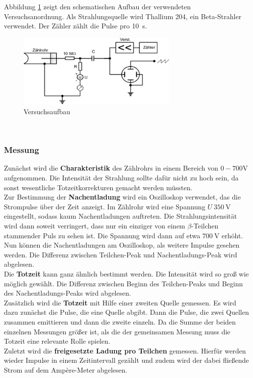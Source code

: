 Abbildung \ref{fig:Versuchsaufbau} zeigt den schematischen Aufbau der verwendeten Versuchsanordnung. Als Strahlungsquelle wird Thallium 204, ein Beta-Strahler verwendet. Der Zähler zählt die Pulse pro \SI{10}{\second}.
\begin{figure}[h!]
	\centering
	\includegraphics[width=0.7\textwidth]{Versuchsaufbau.pdf}
	\caption{Versuchsaufbau}
	\label{fig:Versuchsaufbau}
\end{figure} \\
\subsubsection*{Messung}
Zunächst wird die \textbf{Charakteristik} des Zählrohrs in einem Bereich von $0-700$V aufgenommen. Die Intensität der Strahlung sollte dafür nicht zu hoch sein, da sonst wesentliche Totzeitkorrekturen gemacht werden müssten. \\
Zur Bestimmung der \textbf{Nachentladung} wird ein Oszilloskop verwendet, das die Strompulse über der Zeit anzeigt. Im Zählrohr wird eine Spannung $U~\SI{350}{\volt}$ eingestellt, sodass kaum Nachentladungen auftreten. Die Strahlungsintensität wird dann soweit verringert, dass nur ein einziger von einem $\beta$-Teilchen stammender Puls zu sehen ist. Die Spannung wird dann auf etwa $\SI{700}{\volt}$ erhöht. Nun können die Nachentladungen am Oszilloskop, als weitere Impulse gesehen werden. Die Differenz zwischen Teilchen-Peak und Nachentladungs-Peak wird abgelesen. \\
Die \textbf{Totzeit} kann ganz ähnlich bestimmt werden. Die Intensität wird so groß wie möglich gewählt. Die Differenz zwischen Beginn des Teilchen-Peaks und Beginn des Nachentladungs-Peaks wird abgelesen. \\
Zusätzlich wird die \textbf{Totzeit} mit Hilfe einer zweiten Quelle gemessen. Es wird dazu zunächst die Pulse, die eine Quelle abgibt. Dann die Pulse, die zwei Quellen zusammen emittieren und dann die zweite einzeln. Da die Summe der beiden einzelnen Messungen größer ist, als die der gemeinsamen Messung muss die Totzeit eine relevante Rolle spielen. \\
Zuletzt wird die \textbf{freigesetzte Ladung pro Teilchen} gemessen. Hierfür werden wieder Impulse in einem Zeitintervall gezählt und zudem wird der dabei fließende Strom auf dem Ampère-Meter abgelesen.